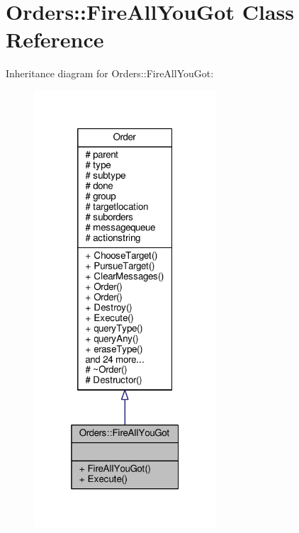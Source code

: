 \hypertarget{classOrders_1_1FireAllYouGot}{}\section{Orders\+:\+:Fire\+All\+You\+Got Class Reference}
\label{classOrders_1_1FireAllYouGot}


Inheritance diagram for Orders\+:\+:Fire\+All\+You\+Got\+:
\nopagebreak
\begin{figure}[H]
\begin{center}
\leavevmode
\includegraphics[width=193pt]{de/d0d/classOrders_1_1FireAllYouGot__inherit__graph}
\end{center}
\end{figure}



